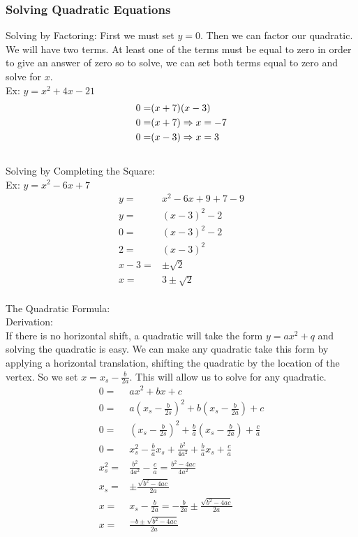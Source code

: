 \documentclass[11pt, fleqn]{article}
\begin{document}
\subsubsection{Solving Quadratic Equations}
Solving by Factoring:
First we must set $y=0$. Then we can factor our quadratic. We will have two terms. At least one of the terms must be equal to zero in order to give an answer of zero so to solve, we can set both terms equal to zero and solve for $x$.\\
Ex: $y=x^2+4x-21$
\begin{align*}
    0=&(x+7)(x-3)\\
    0=&(x+7)\Rightarrow x=-7\\
    0=&(x-3)\Rightarrow x=3
\end{align*}
\\
Solving by Completing the Square:\\
Ex: $y=x^2-6x+7$
\begin{align*}
    y=&x^2-6x+9+7-9\\
    y=&(x-3)^2-2\\
    0=&(x-3)^2-2\\
    2=&(x-3)^2\\
    x-3=&\pm \sqrt{2}\\
    x=&3\pm \sqrt{2}
\end{align*}
\\
The Quadratic Formula:\\
Derivation:\\
If there is no horizontal shift, a quadratic will take the form $y=ax^2+q$ and solving the quadratic is easy. We can make any quadratic take this form by applying a horizontal translation, shifting the quadratic by the location of the vertex. So we set $x=x_s-\frac{b}{2a}$. This will allow us to solve for any quadratic.
\begin{align*}
    0=&ax^2+bx+c\\
    0=&a\left(x_s-\frac{b}{2s}\right)^2+b\left(x_s-\frac{b}{2a}\right)+c\\
    0=&\left(x_s-\frac{b}{2s}\right)^2+\frac{b}{a}\left(x_s-\frac{b}{2a}\right)+\frac{c}{a}\\
    0=&x_s^2-\frac{b}{a}x_s+\frac{b^2}{4a^2}+\frac{b}{a}x_s+\frac{c}{a}\\
    x_s^2=&\frac{b^2}{4a^2}-\frac{c}{a}=\frac{b^2-4ac}{4a^2}\\
    x_s=&\pm\frac{\sqrt{b^2-4ac}}{2a}\\
    x=&x_s-\frac{b}{2a}=-\frac{b}{2a}\pm\frac{\sqrt{b^2-4ac}}{2a}\\
    x=&\frac{-b\pm\sqrt{b^2-4ac}}{2a}
\end{align*}
\end{document}
